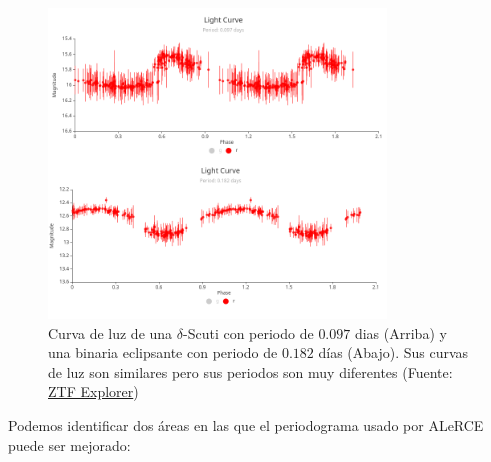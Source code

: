 \begin{figure}[t]
    \centering
    \includegraphics[width=0.8\textwidth]{./figs/scutti-vs-eb.png}
    \caption{Curva de luz de una $\delta$-Scuti con periodo de $0.097$ dias (Arriba) y una binaria eclipsante con periodo de $0.182$ días (Abajo). Sus curvas de luz son similares pero sus periodos son muy diferentes (Fuente: \href{https://alerce.online/}{ZTF Explorer})}
    \label{fig:scuti-vs-eb}
\end{figure}

Podemos identificar dos áreas en las que el periodograma usado por ALeRCE puede ser mejorado:

